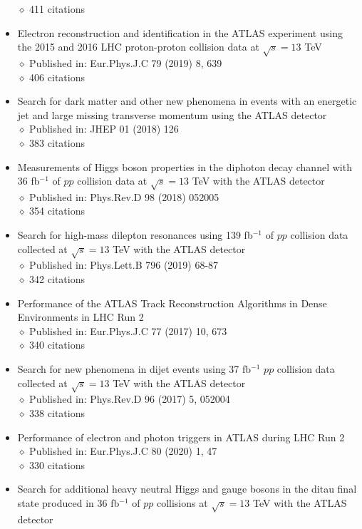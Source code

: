 \documentclass[margin, 10pt]{res} %
\begin{document}
\begin{resume}
\begin{itemize}
$\diamond$ 411 citations
\item Electron reconstruction and identification in the ATLAS experiment using the 2015 and 2016 LHC proton-proton collision data at $\sqrt{s} = 13$ TeV\\
$\diamond$ Published in: Eur.Phys.J.C 79 (2019) 8, 639\\
$\diamond$ 406 citations
\item Search for dark matter and other new phenomena in events with an energetic jet and large missing transverse momentum using the ATLAS detector\\
$\diamond$ Published in: JHEP 01 (2018) 126\\
$\diamond$ 383 citations
\item Measurements of Higgs boson properties in the diphoton decay channel with 36 fb$^{-1}$ of $pp$ collision data at $\sqrt{s} = 13$ TeV with the ATLAS detector\\
$\diamond$ Published in: Phys.Rev.D 98 (2018) 052005\\
$\diamond$ 354 citations
\item Search for high-mass dilepton resonances using 139 fb$^{-1}$ of $pp$ collision data collected at $\sqrt{s} = 13$ TeV with the ATLAS detector\\
$\diamond$ Published in: Phys.Lett.B 796 (2019) 68-87\\
$\diamond$ 342 citations
\item Performance of the ATLAS Track Reconstruction Algorithms in Dense Environments in LHC Run 2\\
$\diamond$ Published in: Eur.Phys.J.C 77 (2017) 10, 673\\
$\diamond$ 340 citations
\item Search for new phenomena in dijet events using 37 fb$^{-1}$ $pp$ collision data collected at $\sqrt{s} = 13$ TeV with the ATLAS detector\\
$\diamond$ Published in: Phys.Rev.D 96 (2017) 5, 052004\\
$\diamond$ 338 citations
\item Performance of electron and photon triggers in ATLAS during LHC Run 2\\
$\diamond$ Published in: Eur.Phys.J.C 80 (2020) 1, 47\\
$\diamond$ 330 citations
\item Search for additional heavy neutral Higgs and gauge bosons in the ditau final state produced in 36 fb$^{-1}$ of $pp$ collisions at $\sqrt{s} = 13$ TeV with the ATLAS detector\\

\end{itemize}
\end{resume}
\end{document}

